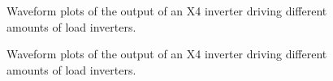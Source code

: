 \documentclass[10pt]{article}
\begin{document}
\begin{figure}[htb]
    \centering
    \begingroup
    \fontsize{8pt}{8pt}\selectfont
    
    \endgroup
    \caption{Waveform plots of the output of an X4 inverter driving different amounts of load inverters.}
    \label{aoi}
\end{figure}
\begin{figure}[htb]
    \centering
    \begingroup
    \fontsize{8pt}{8pt}\selectfont
    
    \endgroup
    \caption{Waveform plots of the output of an X4 inverter driving different amounts of load inverters.}
    \label{INVx1}
\end{figure}
\end{document}
